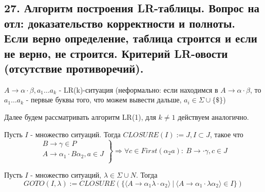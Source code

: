 \subsection{27. Алгоритм построения LR-таблицы. Вопрос на отл: доказательство корректности и полноты. Если верно определение, таблица строится и если не верно, не строится. Критерий LR-овости (отсутствие противоречий).}

\par \Def $A \rightarrow \alpha \cdot \beta, a_1 \ldots a_k$ - LR(k)-ситуация (неформально: если находимся в $A \rightarrow \alpha \cdot \beta$, то $a_1 \ldots a_k$ - первые буквы того, что можем вывести дальше, $a_i \in \Sigma \cup \{\$\}$)
\par \Note Далее будем рассматривать алгоритм LR(1), для $k \neq 1$ действуем аналогично.
\par \Def Пусть $I$ - множество ситуаций. Тогда $CLOSURE(I):=J, I \subset J$, такое что
$$\left.\begin{array}{c}
B \rightarrow \gamma \in P\\
A \rightarrow \alpha_1 \cdot B \alpha_2, a \in J\\
\end{array}
\right\} \Rightarrow \forall c \in First(\alpha_2 a): \: B \rightarrow \cdot \gamma, c \in J$$
\par \Def Пусть $I$ - множество ситуаций, $\lambda \in \Sigma \cup N$. Тогда $$GOTO(I, \lambda):=CLOSURE(\{\langle A \rightarrow \alpha_1 \lambda \cdot \alpha_2 \rangle \: | \: \langle A \rightarrow \alpha_1  \cdot\lambda \alpha_2 \rangle \in I\})$$
\begin{figure}[h]
\end{figure}

